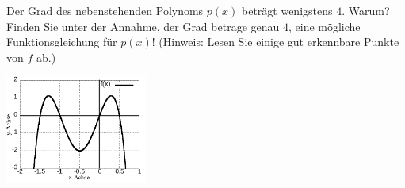 \item

\begin{multicols}{2}

Der Grad des nebenstehenden Polynoms $p(x)$ beträgt wenigstens $4$. Warum? Finden Sie unter der Annahme, der Grad betrage genau $4$, eine mögliche Funktionsgleichung für $p(x)$! (Hinweis: Lesen Sie einige gut erkennbare Punkte von $f$ ab.) 

\columnbreak

\includegraphics[width=0.35\textwidth]{../tex-snippets/ex-graph-read-2-img-a.png}

\end{multicols}

